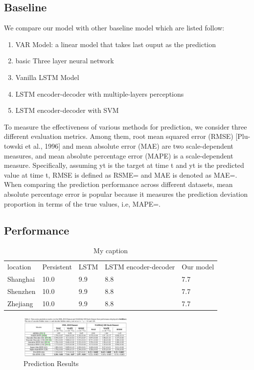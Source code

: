 \documentclass[5p]{elsarticle}
\begin{document}
\subsection{Baseline}
We compare our model with other baseline model which are listed follow:
\begin{enumerate}
  \item VAR Model: a linear model that takes last ouput as the prediction
  \item basic Three layer neural network
  \item Vanilla LSTM Model
  \item LSTM encoder-decoder with multiple-layers perceptions
  \item LSTM encoder-decoder with SVM
\end{enumerate}

To measure the effectiveness of various methods for prediction, we consider three different evaluation metrics. Among them, root mean squared error (RMSE) [Plu- towski et al., 1996] and mean absolute error (MAE) are two scale-dependent measures, and mean absolute percentage error (MAPE) is a scale-dependent measure. Specifically, assuming yt is the target at time t and yt is the predicted value at time t, RMSE is defined as RSME={} and MAE is denoted as MAE={}. When comparing the prediction performance across different datasets, mean absolute percentage error is popular because it measures the prediction deviation proportion in terms of the true values, i.e, MAPE={}.


\subsection{Performance}
\begin{table}[]
\centering
\caption{My caption}
\label{my-label}
\begin{tabular}{lllll}
location & Persistent & LSTM & LSTM encoder-decoder & Our model \\
Shanghai & 10.0       & 9.9  & 8.8                  & 7.7       \\
Shenzhen & 10.0       & 9.9  & 8.8                  & 7.7       \\
Zhejiang & 10.0       & 9.9  & 8.8                  & 7.7      
\end{tabular}
\end{table}

\begin{figure}[h]
    \centering
    \includegraphics[width=0.5\textwidth]{prediction_results.png}
    \caption{Prediction Results}
    \label{fig:Prediction Results}
\end{figure}
\end{document}
